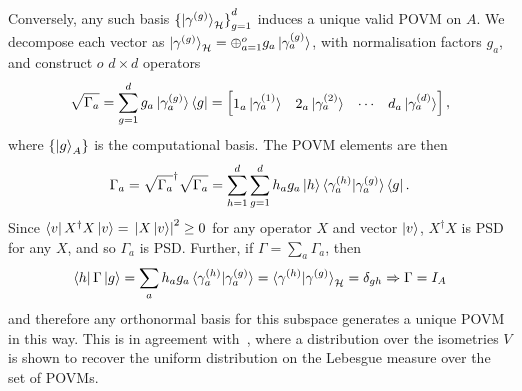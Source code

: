 \documentclass[10pt, a4paper]{article}
\numberwithin{equation}{section} %
\theoremstyle{definition}
\theoremstyle{plain}
\newcommand{\abs}[1]{\mathop{}\left\lvert#1\right\rvert}
\newcommand{\?}{\mathrel{?}} %
\newcommand{\Hs}{\mathcal{H}} %
\begin{document}
                        Conversely, any such basis \({\{\ket{\gamma^{(g)}}_{\Hs}\}}_{g=1}^d\) induces a unique valid POVM on \(A\). We decompose each vector as \(\ket{\gamma^{(g)}}_{\Hs} = \oplus_{a=1}^o g_a \ket{\gamma^{(g)}_a}\), with normalisation factors \(g_a\), and construct \(o\) \(d\times{d}\) operators 
                        \begin{equation}
                          \sqrt{\Gamma_a} = \sum_{g=1}^d g_a \ket{\gamma^{(g)}_a}\bra{g} = \begin{bmatrix} 1_a \ket{\gamma^{(1)}_a} & 2_a \ket{\gamma^{(2)}_a} & \cdots & d_a \ket{\gamma^{(d)}_a} \end{bmatrix},
                        \end{equation}
                        where \({\{\ket{g}_A\}}\) is the computational basis. The POVM elements are then 
                        \begin{equation}
                          \Gamma_a = \sqrt{\Gamma_a}^{\dagger}\sqrt{\Gamma_a} = \sum_{h=1}^d \sum_{g=1}^d h_a g_a \ket{h}\braket{\gamma^{(h)}_a|\gamma^{(g)}_a}\bra{g}.
                        \end{equation}
                        Since \(\bra{v}X^{\dagger}X\ket{v} = \abs{X\ket{v}}^2 \geq 0\) for any operator \(X\) and vector \(\ket{v}\), \(X^{\dagger}X\) is PSD for any \(X\), and so \(\Gamma_a\) is PSD. Further, if \(\Gamma = \sum_a \Gamma_a\), then 
                        \begin{equation}
                          \bra{h}\Gamma\ket{g} = \sum_a h_a g_a \braket{\gamma^{(h)}_a|\gamma^{(g)}_a} = \braket{\gamma^{(h)}|\gamma^{(g)}}_{\Hs} = \delta_{gh} \Rightarrow \Gamma = I_A
                        \end{equation}
                        and therefore any orthonormal basis for this subspace generates a unique POVM in this way. This is in agreement with~\cite{RandPOVM}, where a distribution over the isometries \(V\) is shown to recover the uniform distribution on the Lebesgue measure over the set of POVMs.
\end{document}
